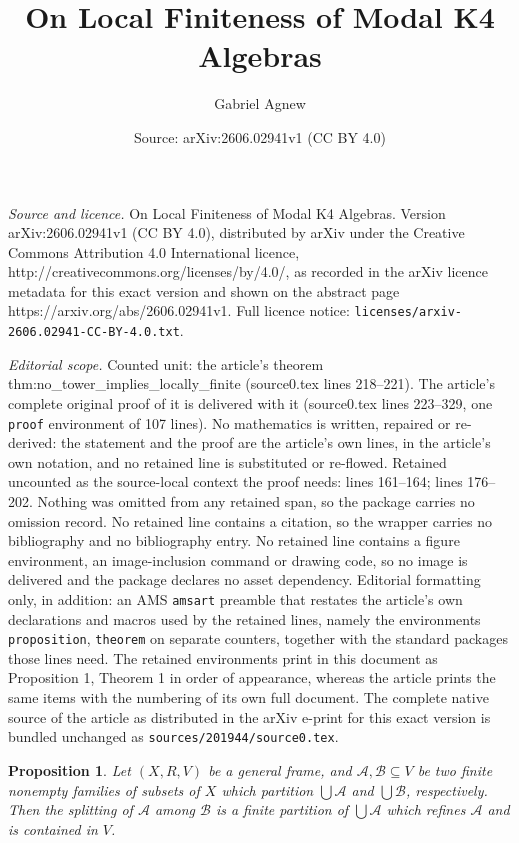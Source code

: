 \documentclass[10pt,a4paper]{amsart}
\title{On Local Finiteness of Modal K4 Algebras}
\author{Gabriel Agnew}
\date{Source: arXiv:2606.02941v1 (CC BY 4.0)}
\newtheorem{proposition}{Proposition}
\begin{document}
\maketitle

\noindent\emph{Source and licence.} On Local Finiteness of Modal K4 Algebras. Version arXiv:2606.02941v1 (CC BY 4.0), distributed by arXiv under the Creative Commons Attribution 4.0 International licence, http://creativecommons.org/licenses/by/4.0/, as recorded in the arXiv licence metadata for this exact version and shown on the abstract page https://arxiv.org/abs/2606.02941v1. Full licence notice: \texttt{licenses/arxiv-2606.02941-CC-BY-4.0.txt}.\par\smallskip

\noindent\textit{Editorial scope.} Counted unit: the article's theorem thm:no\_tower\_implies\_locally\_finite (source0.tex lines 218--221). The article's complete original proof of it is delivered with it (source0.tex lines 223--329, one \texttt{proof} environment of 107 lines). No mathematics is written, repaired or re-derived: the statement and the proof are the article's own lines, in the article's own notation, and no retained line is substituted or re-flowed.  Retained uncounted as the source-local context the proof needs: lines 161--164; lines 176--202.  Nothing was omitted from any retained span, so the package carries no omission record.  No retained line contains a citation, so the wrapper carries no bibliography and no bibliography entry.  No retained line contains a figure environment, an image-inclusion command or drawing code, so no image is delivered and the package declares no asset dependency.  Editorial formatting only, in addition: an AMS \texttt{amsart} preamble that restates the article's own declarations and macros used by the retained lines, namely the environments \texttt{proposition}, \texttt{theorem} on separate counters, together with the standard packages those lines need.  The retained environments print in this document as Proposition 1, Theorem 1 in order of appearance, whereas the article prints the same items with the numbering of its own full document.  The complete native source of the article as distributed in the arXiv e-print for this exact version is bundled unchanged as \texttt{sources/201944/source0.tex}.
\begin{proposition} \label{prop:splitting}
    Let $(X,R,V)$ be a general frame, and $\mathcal{A},\mathcal{B} \subseteq V$ be two finite nonempty families of subsets of $X$ which partition $\bigcup \mathcal{A}$ and $\bigcup \mathcal{B}$, respectively.
    Then the splitting of $\mathcal{A}$ among $\mathcal{B}$ is a finite partition of $\bigcup \mathcal{A}$ which refines $\mathcal{A}$ and is contained in $V$.
\end{proposition}
\end{document}
